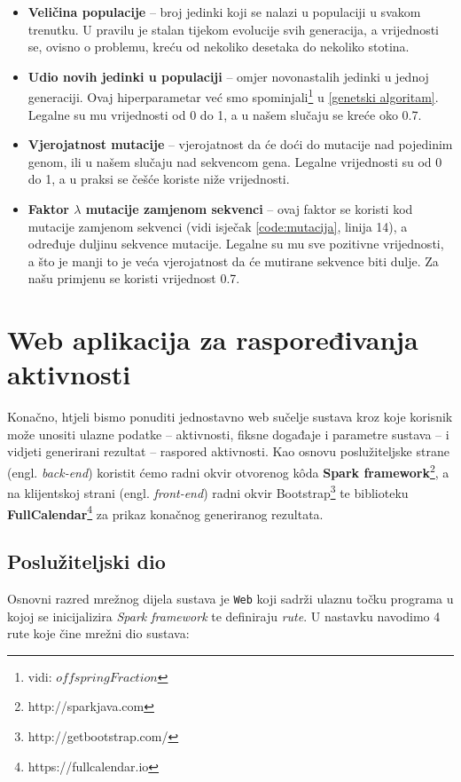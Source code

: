 \documentclass[times, utf8, zavrsni]{fer}
\begin{document}
\begin{itemize}
	\item \textbf{Veličina populacije} -- broj jedinki koji se nalazi u populaciji u svakom trenutku. U pravilu je stalan tijekom evolucije svih generacija, a vrijednosti se, ovisno o problemu, kreću od nekoliko desetaka do nekoliko stotina.
	\item \textbf{Udio novih jedinki u populaciji} -- omjer novonastalih jedinki u jednoj generaciji. Ovaj hiperparametar već smo spominjali\footnote{vidi: $offspringFraction$} u \ref{genetski algoritam}. Legalne su mu vrijednosti od 0 do 1, a u našem slučaju se kreće oko 0.7.
	\item \textbf{Vjerojatnost mutacije} -- vjerojatnost da će doći do mutacije nad pojedinim genom, ili u našem slučaju nad sekvencom gena. Legalne vrijednosti su od 0 do 1, a u praksi se češće koriste niže vrijednosti.
	\item \textbf{Faktor $\lambda$ mutacije zamjenom sekvenci} -- ovaj faktor se koristi kod mutacije zamjenom sekvenci (vidi isječak \ref{code:mutacija}, linija 14), a određuje duljinu sekvence mutacije. Legalne su mu sve pozitivne vrijednosti, a što je manji to je veća vjerojatnost da će mutirane sekvence biti dulje. Za našu primjenu se koristi vrijednost 0.7.
	
\end{itemize}

\chapter{Web aplikacija za raspoređivanja aktivnosti}\label{web aplikacija}
Konačno, htjeli bismo ponuditi jednostavno web sučelje sustava kroz koje korisnik može unositi ulazne podatke -- aktivnosti, fiksne događaje i parametre sustava -- i vidjeti generirani rezultat -- raspored aktivnosti. Kao osnovu poslužiteljske strane (engl. \textit{back-end}) koristit ćemo radni okvir otvorenog k\^{o}da \textbf{Spark framework}\footnote{http://sparkjava.com}, a na klijentskoj strani (engl. \textit{front-end}) radni okvir Bootstrap\footnote{http://getbootstrap.com/} te biblioteku \textbf{FullCalendar}\footnote{https://fullcalendar.io} za prikaz konačnog generiranog rezultata.

\section{Poslužiteljski dio}
Osnovni razred mrežnog dijela sustava je \texttt{Web} koji sadrži ulaznu točku programa u kojoj se inicijalizira \textit{Spark framework} te definiraju \textit{rute}. U nastavku navodimo 4 rute koje čine mrežni dio sustava:
\end{document}
